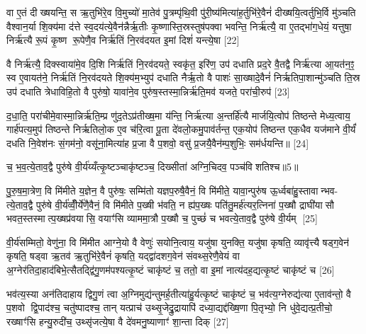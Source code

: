 वा ए॒तं दीख्षयन्ति॒ स ऋ॒तुभि॑रे॒व वि॒मुच्यो॑ मा॒तेव॑ पु॒त्रम्पृ॑थि॒वी पु॑री॒ष्य॑मित्या॑ह॒र्तुभि॑रे॒वैनं॑ दीख्षयि॒त्वर्तुभि॒र्वि मु॑ञ्चति वैश्वान॒र्या शि॒क्य॑मा द॑त्ते स्व॒दय॑त्ये॒वैन॑न्नैर्\mbox{}ऋ॒तीः कृ॒ष्णास्ति॒स्रस्तुष॑पक्वा भवन्ति॒ निर्\mbox{}ऋ॑त्यै॒ वा ए॒तद्भा॑ग॒धेयं॒ यत्तुषा॒ निर्\mbox{}ऋ॑त्यै रू॒पं कृ॒ष्ण रू॒पेणै॒व निर्\mbox{}ऋ॑तिं नि॒रव॑दयत इ॒मां दिशं॑ यन्त्ये॒षा [22]

वै निर्\mbox{}ऋ॑त्यै॒ दिक्स्वाया॑मे॒व दि॒शि निर्\mbox{}ऋ॑तिं नि॒रव॑दयते॒ स्वकृ॑त॒ इरि॑ण॒ उप॑ दधाति प्रद॒रे वै॒तद्वै निर्\mbox{}ऋ॑त्या आ॒यत॑न॒ꣵ॒ स्व ए॒वायत॑ने॒ निर्\mbox{}ऋ॑तिं नि॒रव॑दयते शि॒क्य॑म॒भ्युप॑ दधाति नैर्\mbox{}ऋ॒तो वै पाशः॑ सा॒ख्षादे॒वैनं॑ निर्\mbox{}ऋतिपा॒शान्मु॑ञ्चति ति॒स्र उप॑ दधाति त्रेधाविहि॒तो वै पुरु॑षो॒ यावा॑ने॒व पुरु॑ष॒स्तस्मा॒न्निर्\mbox{}ऋ॑ति॒मव॑ यजते॒ परा॑ची॒रुप॑ [23]

द॒धा॒ति॒ परा॑चीमे॒वास्मा॒न्निर्\mbox{}ऋ॑ति॒म्प्र णु॑द॒तेऽप्र॑तीख्ष॒मा य॑न्ति॒ निर्\mbox{}ऋ॑त्या अ॒न्तर्\mbox{}हि॑त्यै मार्जयि॒त्वोप॑ तिष्ठन्ते मेध्य॒त्वाय॒ गार्\mbox{}ह॑पत्य॒मुप॑ तिष्ठन्ते निर्\mbox{}ऋतिलो॒क ए॒व च॑रि॒त्वा पू॒ता दे॑वलो॒कमु॒पाव॑र्तन्त॒ एक॒योप॑ तिष्ठन्त एक॒धैव यज॑माने वी॒र्यं॑ दधति नि॒वेश॑नः सं॒गम॑नो॒ वसू॑ना॒मित्या॑ह प्र॒जा वै प॒शवो॒ वसु॑ प्र॒जयै॒वैन॑म्प॒शुभिः॒ सम॑र्धयन्ति॥ [24]

{\scriptsize {च॒ भ॒व॒त्ये॒ताव॒द्वै पुरु॑षे वी॒र्य॑य्यँत्कृ॒ष्टञ्चाकृ॑ष्टञ्च॒ दिख्सीता॑ अग्नि॒चिदव॒ पञ्च॑विशतिश्च॥5॥}}

पु॒रु॒ष॒मा॒त्रेण॒ वि मि॑मीते य॒ज्ञेन॒ वै पुरु॑षः॒ सम्मि॑तो यज्ञप॒रुषै॒वैनं॒ वि मि॑मीते॒ यावा॒न्पुरु॑ष ऊ॒र्ध्वबा॑हु॒स्तावान्भव- त्ये॒ताव॒द्वै पुरु॑षे वी॒र्य॑व्वीँ॒र्ये॑णै॒वैनं॒ वि मि॑मीते प॒ख्षी भ॑वति॒ न ह्य॑प॒ख्षः पति॑तु॒मर्\mbox{}ह॑त्यर॒त्निना॑ प॒ख्षौ द्राघी॑यासौ भवत॒स्तस्मात्प॒ख्षप्र॑वयासि॒ वयाꣳ॑सि व्याममा॒त्रौ प॒ख्षौ च॒ पुच्छं॑ च भवत्ये॒ताव॒द्वै पुरु॑षे वी॒र्यम् [25]

वी॒र्य॑सम्मितो॒ वेणु॑ना॒ वि मि॑मीत आग्ने॒यो वै वेणुः॑ सयोनि॒त्वाय॒ यजु॑षा युनक्ति॒ यजु॑षा कृषति॒ व्यावृ॑त्त्यै षड्ग॒वेन॑ कृषति॒ षड्वा ऋ॒तव॑ ऋ॒तुभि॑रे॒वैनं॑ कृषति॒ यद्द्वा॑दशग॒वेन॑ संवथ्स॒रेणै॒वेयं वा अ॒ग्नेर॑तिदा॒हाद॑बिभे॒त्सैतद्द्वि॑गु॒णम॑पश्यत्कृ॒ष्टं चाकृ॑ष्टं च॒ ततो॒ वा इ॒मां नात्य॑दह॒द्यत्कृ॒ष्टं चाकृ॑ष्टं च [26]

भव॑त्य॒स्या अन॑तिदाहाय द्विगु॒णं त्वा अ॒ग्निमुद्य॑न्तुमर्\mbox{}ह॒तीत्या॑हु॒र्यत्कृ॒ष्टं चाकृ॑ष्टं च॒ भव॑त्य॒ग्नेरुद्य॑त्या ए॒ताव॑न्तो॒ वै प॒शवो द्वि॒पाद॑श्च॒ चतु॑ष्पादश्च॒ तान् यत्प्राच॑ उथ्सृ॒जेद्रु॒द्रायापि॑ दध्या॒द्यद्द॑ख्षि॒णा पि॒तृभ्यो॒ नि धु॑वे॒द्यत्प्र॒तीचो॒ रख्षाꣳ॑सि हन्यु॒रुदी॑च॒ उथ्सृ॑जत्ये॒षा वै दे॑वमनु॒ष्याणाꣳ॑ शा॒न्ता दिक् [27]

